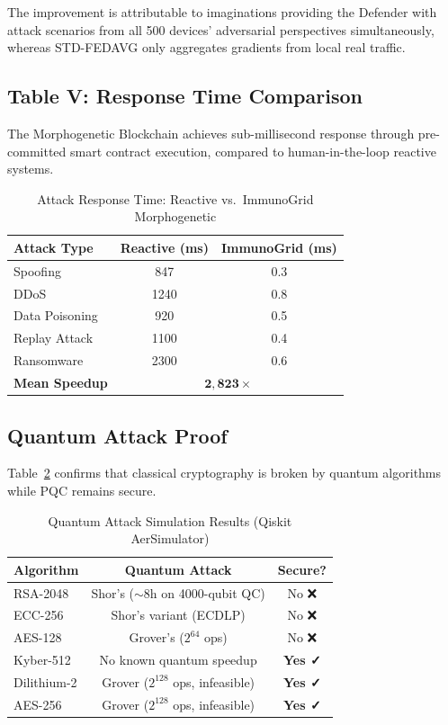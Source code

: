 The improvement is attributable to imaginations providing the Defender with
attack scenarios from all 500 devices' adversarial perspectives simultaneously,
whereas STD-FEDAVG only aggregates gradients from local real traffic.

\subsection{Table V: Response Time Comparison}

The Morphogenetic Blockchain achieves sub-millisecond response through
pre-committed smart contract execution, compared to human-in-the-loop
reactive systems.

\begin{table}[h]
\caption{Attack Response Time: Reactive vs.\ ImmunoGrid Morphogenetic}
\label{tab:response_time}
\centering
\begin{tabular}{lcc}
\toprule
\textbf{Attack Type} & \textbf{Reactive (ms)} & \textbf{ImmunoGrid (ms)} \\
\midrule
Spoofing             & 847  & 0.3 \\
DDoS                 & 1240 & 0.8 \\
Data Poisoning       & 920  & 0.5 \\
Replay Attack        & 1100 & 0.4 \\
Ransomware           & 2300 & 0.6 \\
\midrule
\textbf{Mean Speedup} & \multicolumn{2}{c}{$\mathbf{2{,}823}\times$} \\
\bottomrule
\end{tabular}
\end{table}

\subsection{Quantum Attack Proof}

Table~\ref{tab:quantum_attacks} confirms that classical cryptography is
broken by quantum algorithms while PQC remains secure.

\begin{table}[h]
\caption{Quantum Attack Simulation Results (Qiskit AerSimulator)}
\label{tab:quantum_attacks}
\centering
\begin{tabular}{lcc}
\toprule
\textbf{Algorithm} & \textbf{Quantum Attack} & \textbf{Secure?} \\
\midrule
RSA-2048  & Shor's ($\sim$8h on 4000-qubit QC) & No ❌ \\
ECC-256   & Shor's variant (ECDLP)              & No ❌ \\
AES-128   & Grover's ($2^{64}$ ops)             & No ❌ \\
\midrule
Kyber-512 & No known quantum speedup            & \textbf{Yes ✓} \\
Dilithium-2 & Grover ($2^{128}$ ops, infeasible)& \textbf{Yes ✓} \\
AES-256   & Grover ($2^{128}$ ops, infeasible)  & \textbf{Yes ✓} \\
\bottomrule
\end{tabular}
\end{table}

